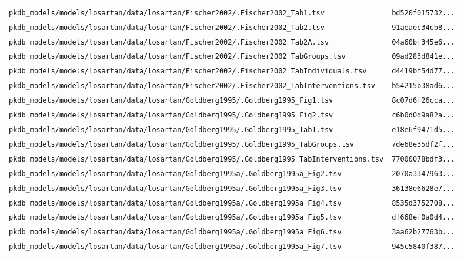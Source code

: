 \documentclass{article}
\begin{document}
\begin{longtable}{ll}
\texttt{pkdb\_models/models/losartan/data/losartan/Fischer2002/.Fischer2002\_Tab1.tsv} & \texttt{bd520f015732...} \\
\texttt{pkdb\_models/models/losartan/data/losartan/Fischer2002/.Fischer2002\_Tab2.tsv} & \texttt{91aeaec34cb8...} \\
\texttt{pkdb\_models/models/losartan/data/losartan/Fischer2002/.Fischer2002\_Tab2A.tsv} & \texttt{04a60bf345e6...} \\
\texttt{pkdb\_models/models/losartan/data/losartan/Fischer2002/.Fischer2002\_TabGroups.tsv} & \texttt{09ad283d841e...} \\
\texttt{pkdb\_models/models/losartan/data/losartan/Fischer2002/.Fischer2002\_TabIndividuals.tsv} & \texttt{d4419bf54d77...} \\
\texttt{pkdb\_models/models/losartan/data/losartan/Fischer2002/.Fischer2002\_TabInterventions.tsv} & \texttt{b54215b38ad6...} \\
\texttt{pkdb\_models/models/losartan/data/losartan/Goldberg1995/.Goldberg1995\_Fig1.tsv} & \texttt{8c07d6f26cca...} \\
\texttt{pkdb\_models/models/losartan/data/losartan/Goldberg1995/.Goldberg1995\_Fig2.tsv} & \texttt{c6b0d0d9a82a...} \\
\texttt{pkdb\_models/models/losartan/data/losartan/Goldberg1995/.Goldberg1995\_Tab1.tsv} & \texttt{e18e6f9471d5...} \\
\texttt{pkdb\_models/models/losartan/data/losartan/Goldberg1995/.Goldberg1995\_TabGroups.tsv} & \texttt{7de68e35df2f...} \\
\texttt{pkdb\_models/models/losartan/data/losartan/Goldberg1995/.Goldberg1995\_TabInterventions.tsv} & \texttt{77000078bdf3...} \\
\texttt{pkdb\_models/models/losartan/data/losartan/Goldberg1995a/.Goldberg1995a\_Fig2.tsv} & \texttt{2070a3347963...} \\
\texttt{pkdb\_models/models/losartan/data/losartan/Goldberg1995a/.Goldberg1995a\_Fig3.tsv} & \texttt{36138e6628e7...} \\
\texttt{pkdb\_models/models/losartan/data/losartan/Goldberg1995a/.Goldberg1995a\_Fig4.tsv} & \texttt{8535d3752708...} \\
\texttt{pkdb\_models/models/losartan/data/losartan/Goldberg1995a/.Goldberg1995a\_Fig5.tsv} & \texttt{df668ef0a0d4...} \\
\texttt{pkdb\_models/models/losartan/data/losartan/Goldberg1995a/.Goldberg1995a\_Fig6.tsv} & \texttt{3aa62b27763b...} \\
\texttt{pkdb\_models/models/losartan/data/losartan/Goldberg1995a/.Goldberg1995a\_Fig7.tsv} & \texttt{945c5840f387...} \\

\end{longtable}
\end{document}
